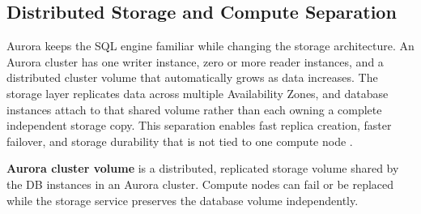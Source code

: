 \subsection{Distributed Storage and Compute Separation}
Aurora keeps the SQL engine familiar while changing the storage architecture. An Aurora cluster has one writer instance, zero or more reader instances, and a distributed cluster volume that automatically grows as data increases. The storage layer replicates data across multiple Availability Zones, and database instances attach to that shared volume rather than each owning a complete independent storage copy. This separation enables fast replica creation, faster failover, and storage durability that is not tied to one compute node \cite{awsAuroraStorage}.

\begin{definitionbox}
\textbf{Aurora cluster volume} is a distributed, replicated storage volume shared by the DB instances in an Aurora cluster. Compute nodes can fail or be replaced while the storage service preserves the database volume independently.
\end{definitionbox}

